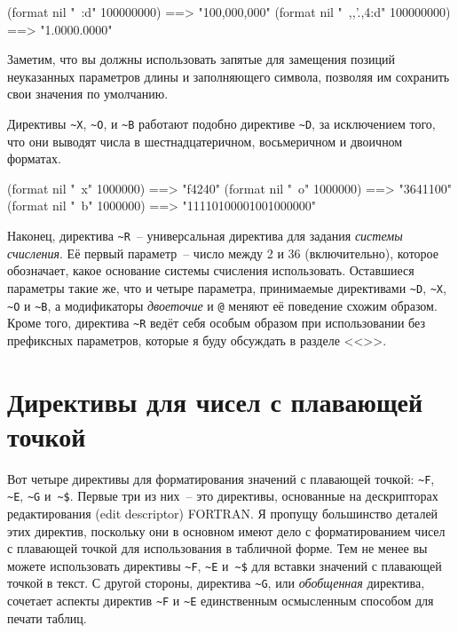 \begin{myverb}
(format nil "~:d" 100000000)       ==> "100,000,000"
(format nil "~,,'.,4:d" 100000000) ==> "1.0000.0000"
\end{myverb}

Заметим, что вы должны использовать запятые для замещения позиций неуказанных параметров
длины и заполняющего символа, позволяя им сохранить свои значения по умолчанию.

Директивы \lstinline!~X!, \lstinline!~O!, и \lstinline!~B! работают подобно директиве
\lstinline!~D!, за исключением того, что они выводят числа в шестнадцатеричном,
восьмеричном и двоичном форматах.

\begin{myverb}
(format nil "~x" 1000000) ==> "f4240"
(format nil "~o" 1000000) ==> "3641100"
(format nil "~b" 1000000) ==> "11110100001001000000"
\end{myverb}

Наконец, директива \lstinline!~R!~-- универсальная директива для задания \textit{системы
  счисления}. Её первый параметр~-- число между 2 и 36 (включительно), которое обозначает,
какое основание системы счисления использовать. Оставшиеся параметры такие же, что и
четыре параметра, принимаемые директивами \lstinline!~D!, \lstinline!~X!, \lstinline!~O! и
\lstinline!~B!, а модификаторы \textit{двоеточие} и \lstinline!@! меняют её поведение
схожим образом. Кроме того, директива \lstinline!~R! ведёт себя особым образом при
использовании без префиксных параметров, которые я буду обсуждать в разделе
<<>>.

\section{Директивы для чисел с плавающей точкой}

Вот четыре директивы для форматирования значений с плавающей точкой: \lstinline!~F!,
\lstinline!~E!, \lstinline!~G! и~\lstinline!~$!. Первые три из них~-- это директивы,
основанные на дескрипторах редактирования (edit descriptor) FORTRAN. Я пропущу большинство
деталей этих директив, поскольку они в основном имеют дело с форматированием чисел с
плавающей точкой для использования в табличной форме. Тем не менее вы можете использовать
директивы \lstinline!~F!, \lstinline!~E! и~\lstinline!~$! для вставки значений с плавающей
точкой в текст.  С другой стороны, директива \lstinline!~G!, или \textit{обобщенная}
директива, сочетает аспекты директив \lstinline!~F! и \lstinline!~E! единственным
осмысленным способом для печати таблиц.

